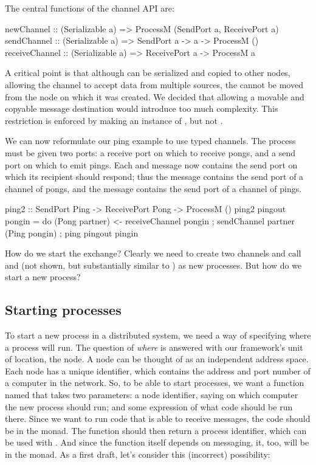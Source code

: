 \documentclass[preprint]{sigplanconf}
\begin{document}
The central functions of the channel API are:

\begin{code}
newChannel :: (Serializable a) => ProcessM (SendPort a, ReceivePort a)
sendChannel :: (Serializable a) => SendPort a -> a -> ProcessM ()
receiveChannel :: (Serializable a) => ReceivePort a -> ProcessM a
\end{code}

A critical point is that although  can be serialized and copied to other nodes, allowing the channel to accept data from multiple sources, the  cannot be moved from the node on which it was created. We decided that allowing a movable and copyable message destination would introduce too much complexity. This restriction is enforced by making  an instance of , but not . 

We can now reformulate our ping example to use typed channels. The process must be given two ports: a receive port on which to receive pongs, and a send port on which to emit pings. Each  and  message now contains the send port on which its recipient should respond; thus the  message contains the send port of a channel of pongs, and the  message contains the send port of a channel of pings.

\begin{code}
ping2 :: SendPort Ping -> ReceivePort Pong -> ProcessM ()
ping2 pingout pongin = 
   do { (Pong partner) <- receiveChannel pongin
      ; sendChannel partner (Ping pongin) 
      ; ping pingout pingin }
\end{code}

How do we start the exchange? Clearly we need to create two channels and call  and  (not shown, but substantially similar to ) as new processes. But how do we start a new process?

\subsection{Starting processes}

To start a new process in a distributed system, we need a way of specifying where a process will run. The question of {\em where} is answered with our framework's unit of location, the node. A node can be thought of as an independent address space. Each node has a unique identifier, which contains the address and port number of a computer in the network. So, to be able to start processes, we want a function named  that takes two parameters: a node identifier, saying on which computer the new process should run; and some expression of what code should be run there. Since we want to run code that is able to receive messages, the code should be in the  monad. The function should then return a process identifier, which can be used with . And since the  function itself depends on messaging, it, too, will be in the  monad. As a first draft, let's consider this (incorrect) possibility:
\end{document}
